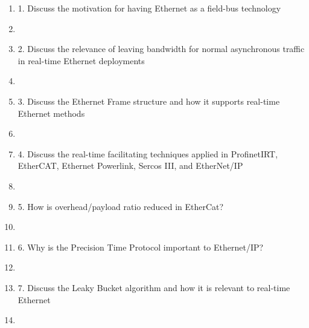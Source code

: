 \documentclass[oneside, 10pt]{article}
\begin{document}
\begin{enumerate}
	\item 1. Discuss the motivation for having Ethernet as a field-bus technology
	\item[]
	
	\item 2. Discuss the relevance of leaving bandwidth for normal asynchronous traffic in real-time Ethernet deployments
	\item[]
	
	\item 3. Discuss the Ethernet Frame structure and how it supports real-time Ethernet methods
	\item[]
	
	\item 4. Discuss the real-time facilitating techniques applied in ProfinetIRT, EtherCAT, Ethernet Powerlink, Sercos III, and EtherNet/IP
	\item[]
	
	\item 5. How is overhead/payload ratio reduced in EtherCat?
	\item[]
	
	\item 6. Why is the Precision Time Protocol important to Ethernet/IP?
	\item[]
	
	\item 7. Discuss the Leaky Bucket algorithm and how it is relevant to real-time Ethernet
	\item[]
	
\end{enumerate}
	
\end{document}
